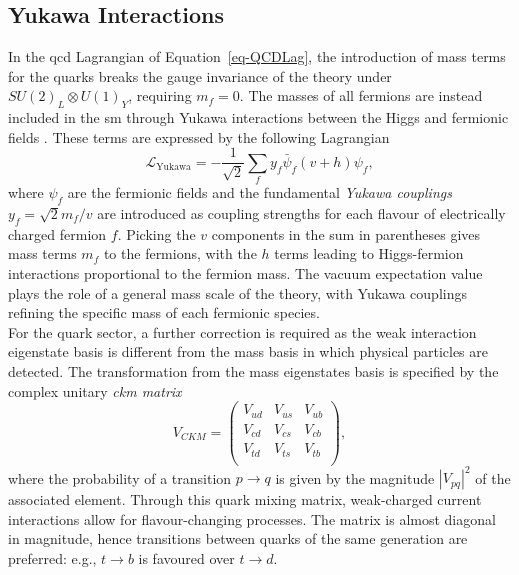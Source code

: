 \subsection{Yukawa Interactions}\label{subset-yukint}
In the \gls{qcd} Lagrangian of Equation~\ref{eq-QCDLag}, the introduction of mass terms for the quarks breaks the gauge invariance of the theory under $SU(2)_L \otimes U(1)_Y$, requiring $m_f = 0$. The masses of all fermions are instead included in the \gls{sm} through Yukawa interactions between the Higgs and fermionic fields \cite{10.1143/PTPS.1.1}. These terms are expressed by the following Lagrangian
\begin{equation}\label{eq-YukLag}
    \mathcal{L}_{\text{Yukawa}} = - \frac{1}{\sqrt{2}} \sum_{f} 
    y_f \bar{\psi}_f (v + h) \psi_f,
\end{equation}
where $\psi_f$ are the fermionic fields and the fundamental \textit{Yukawa couplings} $y_f = \sqrt{2}m_f/v$ are introduced as coupling strengths for each flavour of electrically charged fermion $f$. Picking the $v$ components in the sum in parentheses gives mass terms $m_f$ to the fermions, with the $h$ terms leading to Higgs-fermion interactions proportional to the fermion mass. The vacuum expectation value plays the role of a general mass scale of the theory, with Yukawa couplings refining the specific mass of each fermionic species. \\

For the quark sector, a further correction is required as the weak interaction eigenstate basis is different from the mass basis in which physical particles are detected. The transformation from the mass eigenstates basis is specified by the complex unitary \textit{\gls{ckm} matrix} \cite{Tanabashi:2018oca}
\begin{equation}
    V_{CKM} = \begin{pmatrix}
            V_{ud} & V_{us} & V_{ub}\\ 
            V_{cd} & V_{cs} & V_{cb}\\ 
            V_{td} & V_{ts} & V_{tb}\\ 
        \end{pmatrix},
\end{equation}
where the probability of a transition $p \rightarrow q$ is given by the magnitude $|V_{pq}|^2$ of the associated element. Through this quark mixing matrix, weak-charged current interactions allow for flavour-changing processes. The matrix is almost diagonal in magnitude, hence transitions between quarks of the same generation are preferred: e.g., $t \rightarrow b$ is favoured over $t \rightarrow d$.


